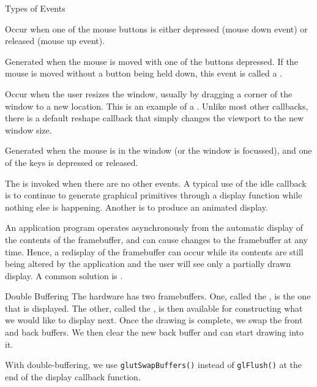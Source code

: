 \documentclass[../notes.tex]{subfiles}
\begin{document}
        \begin{sidenote}{Types of Events}
          $ $\vspace{-1em}
          \begin{descriptimize}
            \item[Mouse Events] Occur when one of the mouse buttons is either depressed
              (mouse down event) or released (mouse up event).
            \item[Move Events] Generated when the mouse is moved with one of the buttons depressed.
              If the mouse is moved without a button being held down, this event is called a
              .
            \item[Reshape Events] Occur when the user resizes the window, usually by dragging a
              corner of the window to a new location.
              This is an example of a .
              Unlike most other callbacks, there is a default reshape callback that simply
              changes the viewport to the new window size.
            \item[Keyboard Events] Generated when the mouse is in the window
              (or the window is focussed), and one of the keys is depressed or released.
          \end{descriptimize}
        \end{sidenote}

        The  is invoked when there are no other events.
        A typical use of the idle callback is to continue to generate graphical primitives
        through a display function while nothing else is happening.
        Another is to produce an animated display.

        An application program operates asynchronously from the automatic display of the contents
        of the framebuffer, and can cause changes to the framebuffer at any time.
        Hence, a redisplay of the framebuffer can occur while its contents are still
        being altered by the application and the user will see only a partially drawn display.
        A common solution is .

        \begin{definition}{Double Buffering}
          The hardware has two framebuffers.
          One, called the , is the one that is displayed.
          The other, called the , is then available for constructing
          what we would like to display next.
          Once the drawing is complete, we swap the front and back buffers.
          We then clear the new back buffer and can start drawing into it.

          With double-buffering, we use \texttt{glutSwapBuffers()} instead of
          \texttt{glFlush()} at the end of the display callback function.
        \end{definition}

\end{document}
